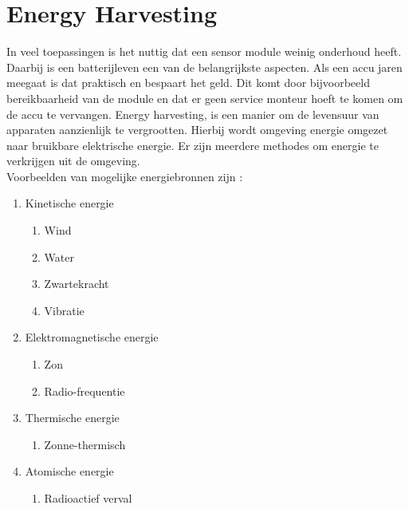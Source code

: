 \section{Energy Harvesting}
In veel toepassingen is het nuttig dat een sensor module weinig onderhoud heeft. Daarbij is een batterijleven een van de belangrijkste aspecten. Als een accu jaren meegaat is dat praktisch en bespaart het geld. Dit komt door bijvoorbeeld bereikbaarheid van de module en dat er geen service monteur hoeft te komen om de accu te vervangen. Energy harvesting, is een manier om de levensuur van apparaten aanzienlijk te vergrootten. Hierbij wordt omgeving energie omgezet naar bruikbare elektrische energie. Er zijn meerdere methodes om energie te verkrijgen uit de omgeving. \\Voorbeelden van mogelijke energiebronnen zijn \cite{energyHarvesting}:
\begin{enumerate}
    \item Kinetische energie
    \begin{enumerate}
        \item Wind
        \item Water
        \item Zwartekracht
        \item Vibratie
    \end{enumerate}
    \item Elektromagnetische energie
    \begin{enumerate}
        \item Zon
        \item Radio-frequentie
    \end{enumerate}
    \item Thermische energie
    \begin{enumerate}
        \item Zonne-thermisch
    \end{enumerate}
    \item Atomische energie
    \begin{enumerate}
        \item Radioactief verval
    \end{enumerate}
\end{enumerate} 
